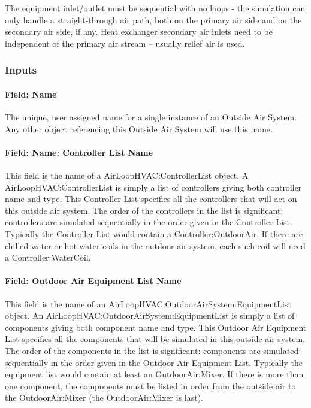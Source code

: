 The equipment inlet/outlet must be sequential with no loops - the simulation can only handle a straight-through air path, both on the primary air side and on the secondary air side, if any. Heat exchanger secondary air inlets need to be independent of the primary air stream -- usually relief air is used.

\subsubsection{Inputs}\label{inputs-3-001}

\paragraph{Field: Name}\label{field-name-3-001}

The unique, user assigned name for a single instance of an Outside Air System. Any other object referencing this Outside Air System will use this name.

\paragraph{Field: Name: Controller List Name}\label{field-name-controller-list-name}

This field is the name of a AirLoopHVAC:ControllerList object. A AirLoopHVAC:ControllerList is simply a list of controllers giving both controller name and type. This Controller List specifies all the controllers that will act on this outside air system. The order of the controllers in the list is significant: controllers are simulated sequentially in the order given in the Controller List. Typically the Controller List would contain a Controller:OutdoorAir. If there are chilled water or hot water coils in the outdoor air system, each such coil will need a Controller:WaterCoil.

\paragraph{Field: Outdoor Air Equipment List Name}\label{field-outdoor-air-equipment-list-name}

This field is the name of an AirLoopHVAC:OutdoorAirSystem:EquipmentList object. An AirLoopHVAC:OutdoorAirSystem:EquipmentList is simply a list of components giving both component name and type. This Outdoor Air Equipment List specifies all the components that will be simulated in this outside air system. The order of the components in the list is significant: components are simulated sequentially in the order given in the Outdoor Air Equipment List. Typically the equipment list would contain at least an OutdoorAir:Mixer. If there is more than one component, the components must be listed in order from the outside air to the OutdoorAir:Mixer (the OutdoorAir:Mixer is last).

